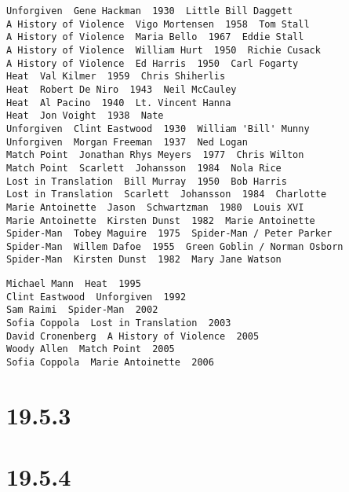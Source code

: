 \documentclass[a4paper, notitlepage]{article}
\begin{document}
\begin{lstlisting}
Unforgiven  Gene Hackman  1930  Little Bill Daggett
A History of Violence  Vigo Mortensen  1958  Tom Stall
A History of Violence  Maria Bello  1967  Eddie Stall
A History of Violence  William Hurt  1950  Richie Cusack
A History of Violence  Ed Harris  1950  Carl Fogarty
Heat  Val Kilmer  1959  Chris Shiherlis
Heat  Robert De Niro  1943  Neil McCauley
Heat  Al Pacino  1940  Lt. Vincent Hanna
Heat  Jon Voight  1938  Nate
Unforgiven  Clint Eastwood  1930  William 'Bill' Munny
Unforgiven  Morgan Freeman  1937  Ned Logan
Match Point  Jonathan Rhys Meyers  1977  Chris Wilton
Match Point  Scarlett  Johansson  1984  Nola Rice
Lost in Translation  Bill Murray  1950  Bob Harris
Lost in Translation  Scarlett  Johansson  1984  Charlotte
Marie Antoinette  Jason  Schwartzman  1980  Louis XVI
Marie Antoinette  Kirsten Dunst  1982  Marie Antoinette
Spider-Man  Tobey Maguire  1975  Spider-Man / Peter Parker
Spider-Man  Willem Dafoe  1955  Green Goblin / Norman Osborn
Spider-Man  Kirsten Dunst  1982  Mary Jane Watson
\end{lstlisting}

\begin{lstlisting}
Michael Mann  Heat  1995
Clint Eastwood  Unforgiven  1992
Sam Raimi  Spider-Man  2002
Sofia Coppola  Lost in Translation  2003
David Cronenberg  A History of Violence  2005
Woody Allen  Match Point  2005
Sofia Coppola  Marie Antoinette  2006
\end{lstlisting}

\section{19.5.3}

\section{19.5.4}
\end{document}
